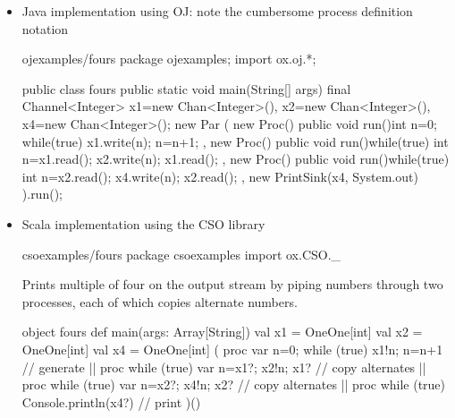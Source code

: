 \documentclass{concdistfoils}
\begin{document}
\begin{slide}
\begin{itemize}
\item Java implementation using OJ: note the cumbersome process definition notation
\vfill

\begin{class}{ojexamples/fours}
package ojexamples; 
import  ox.oj.*;

public  class fours
{public static void main(String[] args)
 {final Channel<Integer> 
        x1=new Chan<Integer>(), x2=new Chan<Integer>(), x4=new Chan<Integer>();
  new Par
  ( new Proc()
    { public void run(){int n=0; while(true){ x1.write(n); n=n+1; }}}
  , new Proc()
    { public void run(){while(true){ int n=x1.read(); x2.write(n); x1.read(); }}}
  , new Proc()
    { public void run(){while(true){ int n=x2.read(); x4.write(n); x2.read(); }}}
  , new PrintSink(x4, System.out)
  ).run();
 }
}
\end{class}

\end{itemize}
\end{slide}

\begin{slide}
\begin{itemize}
\item Scala implementation using the CSO library
\begin{obj}{csoexamples/fours}
package csoexamples
import  ox.CSO._ 
\end{obj}
\begin{doc}{}
Prints multiple of four on the output stream by piping
numbers through two processes, each of which copies alternate numbers.
\end{doc}
\begin{obj}{}
object fours
{ def main(args: Array[String])
  { val x1 = OneOne[int] 
    val x2 = OneOne[int] 
    val x4 = OneOne[int]
    (  proc { var n=0; while (true) { x1!n; n=n+1 } }   // generate
    || proc { while (true) { var n=x1?; x2!n; x1? } }   // copy alternates
    || proc { while (true) { var n=x2?; x4!n; x2? } }   // copy alternates
    || proc { while (true) { Console.println(x4?) } }   // print 
    )()
  }
}
\end{obj}
\end{itemize}
\end{slide}
\end{document}
